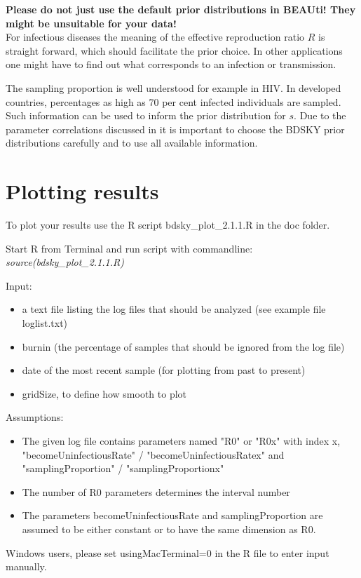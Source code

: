 \documentclass[11pt]{article}
\begin{document}
{\bf Please do not just use the default prior distributions in BEAUti! They might be unsuitable for your data!}\\

For infectious diseases the meaning of the effective reproduction ratio $R$ is straight forward, which should facilitate the prior choice. In other applications one might have to find out what corresponds to an infection or transmission. 

The sampling proportion is well understood for example in HIV. In developed countries, percentages as high as 70 per cent infected individuals are sampled. Such information can be used to inform the prior distribution for $s$. Due to the parameter correlations discussed in \cite[SI]{bdsky} it is important to choose the BDSKY prior distributions carefully and to use all available information.

\section{Plotting results}
To plot your results use the R script bdsky\_plot\_2.1.1.R in the doc folder.

Start R from Terminal and run script with commandline: {\it source(bdsky\_plot\_2.1.1.R) }

Input: 
\begin{itemize} 
\item a text file listing the log files that should be analyzed (see example file loglist.txt)
\item burnin (the percentage of samples that should be ignored from the log file)
\item date of the most recent sample (for plotting from past to present)
\item gridSize, to define how smooth to plot
\end{itemize}

 Assumptions:
\begin{itemize} 
\item The given log file contains parameters named "R0" or "R0x" with index x, 
	"becomeUninfectiousRate" / "becomeUninfectiousRatex" and 
	"samplingProportion" / "samplingProportionx"
\item The number of R0 parameters determines the interval number
\item The parameters becomeUninfectiousRate and samplingProportion are assumed to be either constant or to have the same dimension as R0. 
\end{itemize} 


Windows users, please set usingMacTerminal=0 in the R file to enter input manually.



\end{document}
